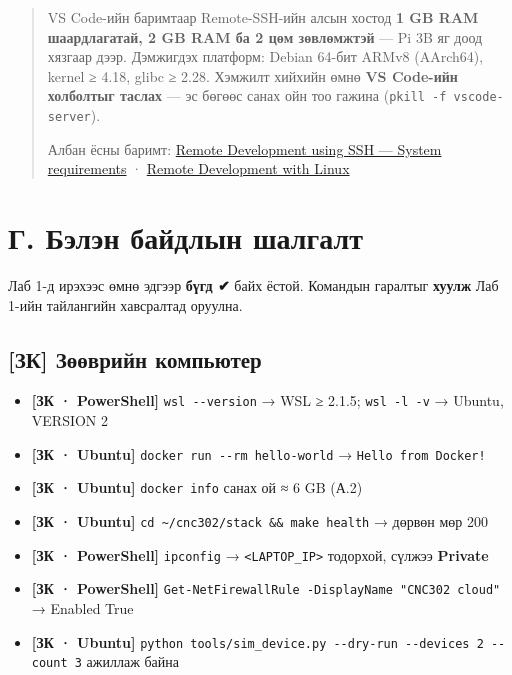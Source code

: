 \begin{quote}
VS Code-ийн баримтаар Remote-SSH-ийн алсын хостод \textbf{1 GB RAM шаардлагатай, 2 GB RAM ба 2 цөм зөвлөмжтэй} --- Pi 3B яг доод хязгаар дээр. Дэмжигдэх платформ: Debian 64-бит ARMv8 (AArch64), kernel ≥ 4.18, glibc ≥ 2.28. Хэмжилт хийхийн өмнө \textbf{VS Code-ийн холболтыг таслах} --- эс бөгөөс санах ойн тоо гажина (\texttt{pkill\ -f\ vscode-server}).

Албан ёсны баримт: \href{https://code.visualstudio.com/docs/remote/ssh}{Remote Development using SSH --- System requirements} · \href{https://code.visualstudio.com/docs/remote/linux}{Remote Development with Linux}
\end{quote}

\hypertarget{ux433.-ux431ux44dux43bux44dux43d-ux431ux430ux439ux434ux43bux44bux43d-ux448ux430ux43bux433ux430ux43bux442}{%
\section{Г. Бэлэн байдлын шалгалт}\label{ux433.-ux431ux44dux43bux44dux43d-ux431ux430ux439ux434ux43bux44bux43d-ux448ux430ux43bux433ux430ux43bux442}}

Лаб 1-д ирэхээс өмнө эдгээр \textbf{бүгд ✔} байх ёстой. Командын гаралтыг \textbf{хуулж} Лаб 1-ийн тайлангийн хавсралтад оруулна.

\hypertarget{ux437ux43a-ux437ux4e9ux4e9ux432ux440ux438ux439ux43d-ux43aux43eux43cux43fux44cux44eux442ux435ux440}{%
\subsection{{[}ЗК{]} Зөөврийн компьютер}\label{ux437ux43a-ux437ux4e9ux4e9ux432ux440ux438ux439ux43d-ux43aux43eux43cux43fux44cux44eux442ux435ux440}}

\begin{itemize}
\tightlist
\item[$\square$]
  \textbf{{[}ЗК · PowerShell{]}} \texttt{wsl\ -\/-version} → WSL ≥ 2.1.5; \texttt{wsl\ -l\ -v} → Ubuntu, VERSION 2
\item[$\square$]
  \textbf{{[}ЗК · Ubuntu{]}} \texttt{docker\ run\ -\/\allowbreak{}-rm\ hello-world} → \texttt{Hello\ from\ Docker!}
\item[$\square$]
  \textbf{{[}ЗК · Ubuntu{]}} \texttt{docker\ info} санах ой ≈ 6 GB (А.2)
\item[$\square$]
  \textbf{{[}ЗК · Ubuntu{]}} \texttt{cd\ \textasciitilde{}/cnc302/stack\ \&\&\ make\ health} → дөрвөн мөр 200
\item[$\square$]
  \textbf{{[}ЗК · PowerShell{]}} \texttt{ipconfig} → \texttt{\textless{}LAPTOP\_\allowbreak{}IP\textgreater{}} тодорхой, сүлжээ \textbf{Private}
\item[$\square$]
  \textbf{{[}ЗК · PowerShell{]}} \texttt{Get-NetFirewallRule\ -DisplayName\ "CNC302\ cloud"} → Enabled True
\item[$\square$]
  \textbf{{[}ЗК · Ubuntu{]}} \texttt{python\ tools/\allowbreak{}sim\_\allowbreak{}device.\allowbreak{}py\ -\/\allowbreak{}-dry-run\ -\/\allowbreak{}-devices\ 2\ -\/\allowbreak{}-count\ 3} ажиллаж байна
\end{itemize}

